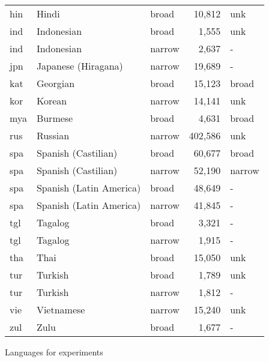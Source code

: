 {\begin{tabularx}{1.05\textwidth}{|Xll >{\raggedright}rl|}
hin                & Hindi                   & broad                  & 10,812                     & unk               \\
ind                & Indonesian              & broad                  & 1,555                      & unk               \\
ind                & Indonesian              & narrow                 & 2,637                      & -                 \\
jpn                & Japanese (Hiragana)     & narrow                 & 19,689                     & -                 \\
kat                & Georgian                & broad                  & 15,123                     & broad             \\
kor                & Korean                  & narrow                 & 14,141                     & unk               \\
mya                & Burmese                 & broad                  & 4,631                      & broad             \\
rus                & Russian                 & narrow                 & 402,586                    & unk               \\
spa                & Spanish (Castilian)     & broad                  & 60,677                     & broad             \\
spa                & Spanish (Castilian)     & narrow                 & 52,190                     & narrow            \\
spa                & Spanish (Latin America) & broad                  & 48,649                     & -                 \\
spa                & Spanish (Latin America) & narrow                 & 41,845                     & -                 \\
tgl                & Tagalog                 & broad                  & 3,321                      & -                 \\
tgl                & Tagalog                 & narrow                 & 1,915                      & -                 \\
tha                & Thai                    & broad                  & 15,050                     & unk               \\
tur                & Turkish                 & broad                  & 1,789                      & unk               \\
tur                & Turkish                 & narrow                 & 1,812                      & -                 \\
vie                & Vietnamese              & narrow                 & 15,240                     & unk               \\
zul                & Zulu                    & broad                  & 1,677                      & -                 \\ \hline
\end{tabularx}}{Languages for experiments}

